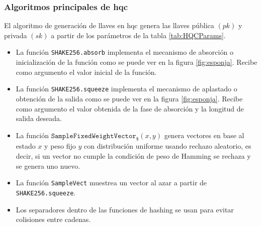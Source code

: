 \subsubsection{Algoritmos principales de \acrshort{hqc} \cite{hqc2025}}
El algoritmo de generación de llaves en \acrshort{hqc} genera las llaves pública \((pk)\) y privada \((sk)\) a partir de los parámetros de la tabla \ref{tab:HQCParams}.
\begin{itemize}
	\item La función \texttt{SHAKE256.absorb} implementa el mecanismo de absorción o inicialización de la función como se puede ver en la figura \ref{fig:esponja}. Recibe como argumento el valor inicial de la función.
	\item La función \texttt{SHAKE256.squeeze} implementa el mecanismo de aplastado o obtención de la salida como se puede ver en la figura \ref{fig:esponja}. Recibe como argumento el valor obtenida de la fase de absorción y la longitud de salida deseada.
	\item La función $\texttt{SampleFixedWeightVector}_{\$}(x,y)$ genera vectores en base al estado \(x\) y peso fijo \(y\) con distribución uniforme usando rechazo aleatorio, es decir, si un vector no cumple la condición de peso de Hamming se rechaza y se genera uno nuevo.
	\item La función \texttt{SampleVect} muestrea un vector al azar a partir de \texttt{SHAKE256.squeeze}.
	\item Los separadores dentro de las funciones de hashing se usan para evitar colisiones entre cadenas.
\end{itemize}
\newpage
